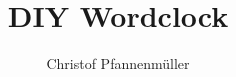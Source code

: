 \documentclass[12pt,journal,compsoc]{IEEEtran}
\begin{document}
%
\title{DIY Wordclock}

\author{Christof Pfannenmüller}%






\maketitle


\IEEEdisplaynotcompsoctitleabstractindextext
\end{document}
